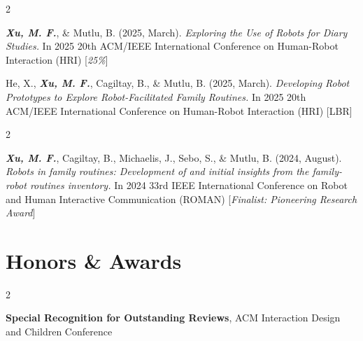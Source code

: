 \documentclass[10pt, letterpaper]{article}
\newenvironment{twocolentry}[2][]{
    \onecolentry
    \def\secondColumn{#2}
    \setcolumnwidth{\fill, 4.5 cm}
    \begin{paracol}{2}
}{
    \switchcolumn \raggedleft \secondColumn
    \end{paracol}
    \endonecolentry
} %
\begin{document}
        \vspace{0.20 cm}
       
        \begin{samepage}
            \begin{twocolentry}{
                2025
            }
                \textbf{\textit{Xu, M. F.}}, \& Mutlu, B. (2025, March). \textit{Exploring the Use of Robots for Diary Studies.} In 2025 20th ACM/IEEE International Conference on Human-Robot Interaction (HRI) [\textit{25\%}]

                \vspace{0.10 cm}
                
                He, X., \textbf{\textit{Xu, M. F.}}, Cagiltay, B., \& Mutlu, B. (2025, March). \textit{Developing Robot Prototypes to Explore Robot-Facilitated Family Routines.} In 2025 20th ACM/IEEE International Conference on Human-Robot Interaction (HRI) [LBR]
            \end{twocolentry}
        \end{samepage}

        \vspace{0.20 cm}

        \begin{samepage}
            \begin{twocolentry}{
                2024
            }
                \textbf{\textit{Xu, M. F.}}, Cagiltay, B., Michaelis, J., Sebo, S., \& Mutlu, B. (2024, August). \textit{Robots in family routines: Development of and initial insights from the family-robot routines inventory.} In 2024 33rd IEEE International Conference on Robot and Human Interactive Communication (ROMAN) [\textit{Finalist: Pioneering Research Award}]
            \end{twocolentry}
        \end{samepage}
        
        \vspace{0.10 cm}


    \section{Honors \& Awards}
        \begin{twocolentry} {2026}
            \textbf{Special Recognition for Outstanding Reviews}, ACM Interaction Design and Children Conference
        \end{twocolentry}

        \vspace{0.1 cm}
\end{document}
